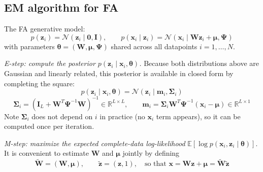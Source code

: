 \documentclass[11pt]{article}
\begin{document}
\subsection{EM algorithm for FA}

The FA generative model:
\[
p(\mathbf{z}_i) = \mathcal{N}(\mathbf{z}_i\mid\mathbf{0},\mathbf{I}), \qquad p(\mathbf{x}_i\mid\mathbf{z}_i) = \mathcal{N}(\mathbf{x}_i\mid\mathbf{Wz}_i+\boldsymbol{\mu},\boldsymbol{\Psi})
\]
with parameters $\boldsymbol{\theta}=(\mathbf{W},\boldsymbol{\mu},\boldsymbol{\Psi})$ shared across all datapoints $i=1,\dots,N$.

\textit{E-step: compute the posterior $p(\mathbf{z}_i\mid\mathbf{x}_i,\boldsymbol{\theta})$.} Because both distributions above are Gaussian and linearly related, this posterior is available in closed form by completing the square:
\[
p(\mathbf{z}_i\mid\mathbf{x}_i,\boldsymbol{\theta}) = \mathcal{N}(\mathbf{z}_i\mid\mathbf{m}_i,\boldsymbol{\Sigma}_i)
\]
\[
\boldsymbol{\Sigma}_i = (\mathbf{I}_L+\mathbf{W}^T\boldsymbol{\Psi}^{-1}\mathbf{W})^{-1} \in \mathbb{R}^{L \times L}, \qquad \mathbf{m}_i = \boldsymbol{\Sigma}_i\mathbf{W}^T\boldsymbol{\Psi}^{-1}(\mathbf{x}_i-\boldsymbol{\mu}) \in \mathbb{R}^{L \times 1}
\]
Note $\boldsymbol{\Sigma}_i$ does not depend on $i$ in practice (no $\mathbf{x}_i$ term appears), so it can be computed once per iteration.

\textit{M-step: maximize the expected complete-data log-likelihood} $\mathbb{E}[\log p(\mathbf{x}_i, \mathbf{z}_i \mid \boldsymbol{\theta})]$. It is convenient to estimate $\mathbf{W}$ and $\boldsymbol{\mu}$ jointly by defining
\[
\tilde{\mathbf{W}} = (\mathbf{W},\boldsymbol{\mu}), \qquad \tilde{\mathbf{z}} = (\mathbf{z},1), \quad \text{so that } \mathbf{x} =\mathbf{W}\mathbf{z} + \boldsymbol{\mu} = \tilde{\mathbf{W}}\tilde{\mathbf{z}}
\]
\end{document}
